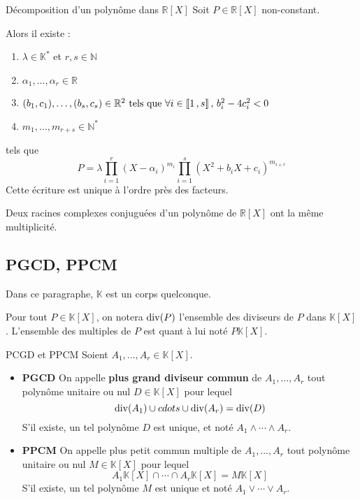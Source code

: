     \begin{coro}{Décomposition d’un polynôme dans $\mathbb{R}[X]$}{}
        Soit $P \in \mathbb{R}[X]$ non-constant.
    
        Alors il existe : 
            \begin{enumerate}
                \item $\lambda \in \mathbb{K}^*$ et $r,s \in \mathbb{N}$
                \item $\alpha_1, \ldots, \alpha_r \in \mathbb{R}$
                \item $(b_1,c_1), \ldots, (b_s,c_s) \in \mathbb{R}^2 \text{ tels que } \forall i \in \left\llbracket 1 \, , s \right\rrbracket, \, b_i^2-4c_i^2 < 0$
                \item $m_1,\ldots,m_{r+s} \in \mathbb{N}^*$
            \end{enumerate}    
        tels que \[ P = \lambda \prod\limits_{i=1}^{r} (X- \alpha_i)^{m_i} \prod\limits_{i=1}^s (X^2 + b_iX + c_i)^{m_{i+r}} \] 
        Cette écriture est unique à l’ordre près des facteurs.
    \end{coro}

    \begin{coro}{}{}
        Deux racines complexes conjuguées d’un polynôme de $\mathbb{R}[X]$ ont la même multiplicité.
    \end{coro}

\subsection{PGCD, PPCM}

    Dans ce paragraphe, $\mathbb{K}$ est un corps quelconque.

    Pour tout $P \in \mathbb{K}[X]$, on notera $\operatorname{div}(P)$ l’ensemble des diviseurs de $P$ dans $\mathbb{K}[X]$. L’ensemble des multiples de $P$ est quant à lui noté $P \mathbb{K}[X]$.

    \begin{defi}{PCGD et PPCM}{}
        Soient $A_1, \ldots, A_r \in \mathbb{K}[X]$.
        \begin{itemize}[label=\textcolor{myyellow}{$\star$}]
            \item \textbf{PGCD} \quad On appelle \textbf{plus grand diviseur commun} de $A_1, \ldots,A_r$ tout polynôme unitaire ou nul $D \in \mathbb{K}[X]$ pour lequel 
            \[ \operatorname{div}(A_1) \cup cdots \cup \operatorname{div}(A_r) = \operatorname{div}(D) \]   
            S’il existe, un tel polynôme $D$ est unique, et noté $A_1 \wedge \cdots \wedge A_r$.
            \item \textbf{PPCM} \quad On appelle plus petit commun multiple de $A_1, \ldots, A_r$ tout polynôme unitaire ou nul $M \in \mathbb{K}[X]$ pour lequel 
            \[ A_1 \mathbb{K}[X] \cap \cdots \cap A_r \mathbb{K}[X] = M \mathbb{K}[X] \]
            S’il existe, un tel polynôme $M$ est unique et noté $A_1 \vee \cdots \vee A_r$.
        \end{itemize}
    \end{defi}

